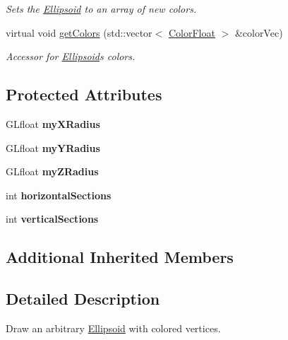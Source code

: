 \begin{DoxyCompactItemize}
\begin{DoxyCompactList}\small\item\em Sets the \hyperlink{classtsgl_1_1_ellipsoid}{Ellipsoid} to an array of new colors. \end{DoxyCompactList}\item 
virtual void \hyperlink{classtsgl_1_1_ellipsoid_ac5c9278659df646c17ef4172e13c7cb3}{get\+Colors} (std\+::vector$<$ \hyperlink{structtsgl_1_1_color_float}{Color\+Float} $>$ \&color\+Vec)
\begin{DoxyCompactList}\small\item\em Accessor for \hyperlink{classtsgl_1_1_ellipsoid}{Ellipsoid}\textquotesingle{}s colors. \end{DoxyCompactList}\end{DoxyCompactItemize}
\subsection*{Protected Attributes}
\begin{DoxyCompactItemize}
\item 
\mbox{\label{classtsgl_1_1_ellipsoid_a065322fb3c3c07b1ed90ff7f5adaca0d}} 
G\+Lfloat {\bfseries my\+X\+Radius}
\item 
\mbox{\label{classtsgl_1_1_ellipsoid_a331185ad15cd3cad43dd46c1633feb97}} 
G\+Lfloat {\bfseries my\+Y\+Radius}
\item 
\mbox{\label{classtsgl_1_1_ellipsoid_af908c43416a1f58b5aa8c2922fdcfe57}} 
G\+Lfloat {\bfseries my\+Z\+Radius}
\item 
\mbox{\label{classtsgl_1_1_ellipsoid_aebaa7282129758fdf7e16e4aae03049b}} 
int {\bfseries horizontal\+Sections}
\item 
\mbox{\label{classtsgl_1_1_ellipsoid_ac863721eb739dd9c3a125ee0f63d3d7b}} 
int {\bfseries vertical\+Sections}
\end{DoxyCompactItemize}
\subsection*{Additional Inherited Members}


\subsection{Detailed Description}
Draw an arbitrary \hyperlink{classtsgl_1_1_ellipsoid}{Ellipsoid} with colored vertices. 

